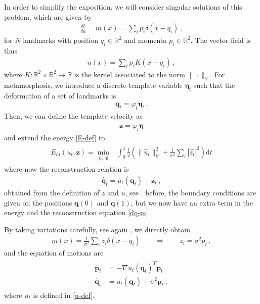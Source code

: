 \documentclass[runningheads]{llncs}
\newcommand{\half}{\frac 12}
\newcommand{\norm}[2]{\| #1 \|_{ #2 }}
\newcommand{\vnorm}[1]{\norm{ #1 }{V}}
\newcommand{\diff}[1]{\text{d} #1}
\begin{document}
In order to simplify the exposition, we will consider singular solutions of this
problem, which are given by \begin{align}
  \frac{\delta l}{\delta u} = m(x) = \sum_i p_i \delta(x-q_i)\,, 
\end{align}
for $N$ landmarks with position $q_i\in \mathbb R^2 $ and momenta $p_i \in \mathbb R^2$. 
The vector field is thus 
\begin{align}
  u(x) = \sum_i p_i K(x-q_i)\,, 
  \label{u-def}
\end{align}
where $K:\mathbb R^2\times \mathbb R^2\to \mathbb R$ is the kernel associated to
the norm $\|\cdot \|_V$.  For metamorphosis, we introduce a discrete template
variable $\boldsymbol \eta_t$ such that the deformation of a set of landmarks is
\begin{align}
  \mathbf q_t = \varphi_t \boldsymbol \eta_t\, . 
  \label{q_t}
\end{align}
Then, we can define the template velocity as 
\begin{align}
  \mathbf z = \varphi_t \dot {\boldsymbol \eta}
  \label{z_eta}
\end{align}
and extend the energy \eqref{E-def} to 
\begin{align}
  \begin{split}
    E_m(u_t,\mathbf z) =\min_{\hat u_t, \hat{\mathbf z}} & \int_0^1
    \half  \left (\vnorm{\hat u_t}^2 + \frac{1}{\sigma^2} \sum_i |\hat{z_i}|^2\right )\diff{t}
  \end{split}
  \label{E_m-def}
\end{align}
where now the reconstruction relation is 
\begin{align}
    \dot{\mathbf q_t} = u_t (\mathbf q_t) + \mathbf z_t\, , 
    \label{dq-m}
\end{align}
obtained from the definition of $z$ and $u$, see \cite{holm2009euler}.  before,
the boundary conditions are given on the positions $\mathbf q(0)$ and $\mathbf
q(1)$, but we now have an extra term in the energy and the reconstruction
equation \eqref{dq-m}. 

By taking variations carefully, see again \cite{holm2009euler}, we directly obtain 
\begin{align}
  m(x) = \frac{1}{\sigma^2} \sum_i z_i\delta(x-q_i)\qquad \Rightarrow \qquad
  z_i = \sigma^2 p_i\, , 
\end{align}
and the equation of motions are
\begin{align}
  \begin{split}
  \dot{\mathbf p_t} &= - \nabla u_t(\mathbf q_t)^T \mathbf p_t\\ 
  \dot{\mathbf q_t} &= u_t(\mathbf q_t) +  \sigma^2\mathbf p_t \,,
  \end{split}
  \label{eq-m-classic}
\end{align}
where $u_t$ is defined in \eqref{u-def}. 
\end{document}
